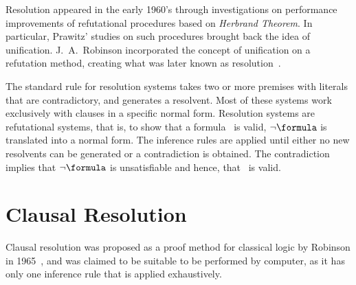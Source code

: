 Resolution appeared in the early 1960's through investigations on performance
improvements of refutational procedures based on \emph{Herbrand Theorem}. In
particular, Prawitz' studies on such procedures brought back the idea of
unification. J.~A.~Robinson incorporated the concept of unification on a
refutation method, creating what was later known as resolution~\cite{casanova}. 

The standard rule for resolution systems takes two or more premises with
literals that are contradictory, and generates a resolvent. Most of these systems
work exclusively with clauses in a specific normal form. Resolution systems are
refutational systems, that is, to show that a formula \formula~is valid, $\neg
\formula$ is translated into a normal form. The inference rules are applied
until either no new resolvents can be generated or a contradiction is obtained.
The contradiction implies that $\neg \formula$ is unsatisfiable and hence, that
\formula~is valid.


\section{Clausal Resolution}

Clausal resolution was proposed as a proof method for classical logic by
Robinson in 1965~\cite{Robinson65}, and was claimed to be suitable to be
performed by computer, as it has only one inference rule that is applied
exhaustively. 




